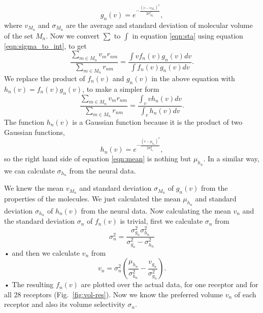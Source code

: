 \documentclass[11pt]{paper} %
\begin{document}
\begin{equation}
g_n(v) = e^{-\frac{(v- v_{M_n})^2}{2\sigma_{M_n}^2}},
\end{equation}
where $v_{M_n}$ and $\sigma_{M_n}$ are the average and standard deviation of molecular volume of the set $M_n$.
Now we convert $\sum$ to $\int$ in equation \ref{eqn:sta} using equation \ref{eqn:sigma_to_int}, to get
\begin{equation}
\frac{\displaystyle \sum_{m\in M_n} v_m r_{nm}}{\displaystyle \sum_{m\in M_n} r_{nm}} = \frac{\displaystyle \int v f_n(v) g_n(v) dv}{\displaystyle \int f_n(v) g_n(v) dv}.
\label{eqn:sta_int}
\end{equation}
We replace the product of $f_n(v)$ and $g_n(v)$ in the above equation with $h_n(v) = f_n(v) g_n(v)$, to make a simpler form
\begin{equation}
\frac{\displaystyle \sum_{m\in M_n} v_m r_{nm}}{\displaystyle \sum_{m\in M_n} r_{nm}} = \frac{\displaystyle \int_v v h_n(v) dv}{ \displaystyle \int_v  h_n(v) dv }.
\label{eqn:mean}
\end{equation}
The function $h_n(v)$ is a Gaussian function because it is the product of two Gaussian functions, 
\begin{equation}
h_n(v) = e^{-\frac{(v-\mu_{h_n})^2}{2\sigma_{h_n}^2}}, 
\end{equation}
so the right hand side of equation \ref{eqn:mean} is nothing but $\mu_{h_n}$. 
In a similar way, we can calculate $\sigma_{h_n}$ from the neural data.

We knew the mean $v_{M_n}$ and standard deviation $\sigma_{M_n}$ of $g_n(v)$ from the properties of the molecules. 
We just calculated the mean $\mu_{h_n}$ and standard deviation $\sigma_{h_n}$ of $h_n(v)$ from the neural data.
Now calculating the mean $v_n$ and the standard deviation $\sigma_n$ of $f_n(v)$ is trivial,
first we calculate $\sigma_n$ from 
\begin{equation}
\sigma_n^2 = \frac{\sigma^2_{g_n} \sigma^2_{h_n}}{\sigma^2_{g_n} - \sigma^2_{h_n}}
\end{equation}•
and then we calculate $v_n$ from 
\begin{equation}
v_n =  \sigma_n^2 \left ( \frac{\mu_{h_n}}{\sigma^2_{h_n}} - \frac{v_{g_n}}{\sigma^2_{g_n}} \right ).
\end{equation}•
The resulting $f_n(v)$ are plotted over the actual data, for one receptor and for all 28 receptors (Fig.~\ref{fig:vol-res}).
Now we know the preferred volume $v_n$ of each receptor and also its volume selectivity $\sigma_n$.
\end{document}

